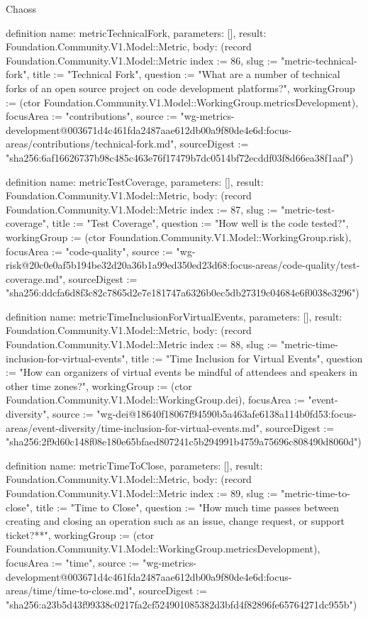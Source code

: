 \begin{lexlean}{Chaoss}
\begin{semanticmodule}
definition{
  name: metricTechnicalFork,
  parameters: [],
  result: Foundation.Community.V1.Model::Metric,
  body: (record Foundation.Community.V1.Model::Metric {index := 86, slug := "metric-technical-fork", title := "Technical Fork", question := "What are a number of technical forks of an open source project on code development platforms?", workingGroup := (ctor Foundation.Community.V1.Model::WorkingGroup.metricsDevelopment), focusArea := "contributions", source := "wg-metrics-development@003671d4c461fda2487aae612db00a9f80de4e6d:focus-areas/contributions/technical-fork.md", sourceDigest := "sha256:6af16626737b98c485c463e76f17479b7dc0514bf72ecddf03f8d66ea38f1aaf"})
}

definition{
  name: metricTestCoverage,
  parameters: [],
  result: Foundation.Community.V1.Model::Metric,
  body: (record Foundation.Community.V1.Model::Metric {index := 87, slug := "metric-test-coverage", title := "Test Coverage", question := "How well is the code tested?", workingGroup := (ctor Foundation.Community.V1.Model::WorkingGroup.risk), focusArea := "code-quality", source := "wg-risk@20c0e0af5b194be32d20a36b1a99ed350ed23d68:focus-areas/code-quality/test-coverage.md", sourceDigest := "sha256:ddcfa6d8f3c82c7865d2e7e181747a6326b0ec5db27319c04684e6f0038e3296"})
}

definition{
  name: metricTimeInclusionForVirtualEvents,
  parameters: [],
  result: Foundation.Community.V1.Model::Metric,
  body: (record Foundation.Community.V1.Model::Metric {index := 88, slug := "metric-time-inclusion-for-virtual-events", title := "Time Inclusion for Virtual Events", question := "How can organizers of virtual events be mindful of attendees and speakers in other time zones?", workingGroup := (ctor Foundation.Community.V1.Model::WorkingGroup.dei), focusArea := "event-diversity", source := "wg-dei@18640f18067f94590b5a463afe6138a114b0fd53:focus-areas/event-diversity/time-inclusion-for-virtual-events.md", sourceDigest := "sha256:2f9d60c148f08e180e65bfaed807241c5b294991b4759a75696c808490d8060d"})
}

definition{
  name: metricTimeToClose,
  parameters: [],
  result: Foundation.Community.V1.Model::Metric,
  body: (record Foundation.Community.V1.Model::Metric {index := 89, slug := "metric-time-to-close", title := "Time to Close", question := "How much time passes between creating and closing an operation such as an issue, change request, or support ticket?**", workingGroup := (ctor Foundation.Community.V1.Model::WorkingGroup.metricsDevelopment), focusArea := "time", source := "wg-metrics-development@003671d4c461fda2487aae612db00a9f80de4e6d:focus-areas/time/time-to-close.md", sourceDigest := "sha256:a23b5d43f99338c0217fa2cf524901085382d3bfd4f82896fe65764271dc955b"})
}


\end{semanticmodule}
\end{lexlean}
